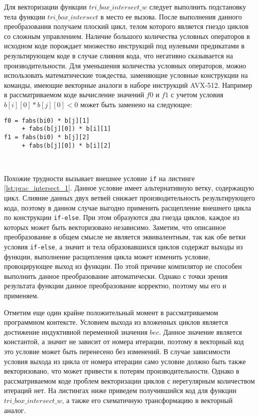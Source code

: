 \documentclass[
11pt,%
tightenlines,%
twoside,%
onecolumn,%
nofloats,%
nobibnotes,%
nofootinbib,%
superscriptaddress,%
noshowpacs,%
centertags]%
{revtex4}
\begin{document}
Для векторизации функции $tri\_box\_intersect\_w$ следует выполнить подстановку тела функции $tri\_box\_intersect$ в место ее вызова.
После выполнения данного преобразования получаем плоский цикл, телом которого является гнездо циклов со сложным управлением.
Наличие большого количества условных операторов в исходном коде порождает множество инструкций под нулевыми предикатами в результирующем коде в случае слияния кода, что негативно сказывается на производительности.
Для уменьшения количества условных операторов, можно использовать математические тождества, заменяющие условные конструкции на команды, имеющие векторные аналоги в наборе инструкций AVX-512.
Например в рассматриваемом коде вычисление значений $f0$ и $f1$ с учетом условия $b[i][0] * b[j][0] < 0$ может быть заменено на следующее:

\begin{lstlisting}[caption={Применение тождеств для использования векторных инструкций.},label={lst:prac_intersect_16_2}]
f0 = fabs(bi0) * b[j][1]
     + fabs(b[j][0]) * b[i][1]
f1 = fabs(bi0) * b[j][2]
     + fabs(b[j][0]) * b[i][2]
\end{lstlisting}

\

Похожие трудности вызывает внешнее условие \texttt{if} на листинге \ref{lst:prac_intersect_1}.
Данное условие имеет альтернативную ветку, содержащую цикл.
Слияние данных двух ветвей снижает производительность результирующего кода, поэтому в данном случае выгодно применить расщепление внешнего цикла по конструкции \texttt{if-else}.
При этом образуются два гнезда циклов, каждое из которых может быть векторизовано независимо.
Заметим, что описанное преобразование в общем смысле не является эквивалентным, так как обе ветки условия \texttt{if-else}, а значит и тела образовавшихся циклов содержат выходы из функции, выполнение расщепления цикла может изменить условие, провоцирующее выход из функции.
По этой причине компилятор не способен выполнить данное преобразование автоматически.
Однако с точки зрения результата функции данное преобразование корректно, поэтому мы его и применяем.

Отметим еще один крайне положительный момент в рассматриваемом программном контексте.
Условием выхода из вложенных циклов является достижение индуктивной переменной значения $bec$.
Данное значение является константой, а значит не зависит от номера итерации, поэтому в векторный код это условие может быть перенесено без изменений.
В случае зависимости условия выхода из цикла от номера итерации само условие должно быть также векторизовано, что может привести к потерям производительности.
Однако в рассматриваемом коде проблем векторизации циклов с нерегулярным количеством итераций нет.
На листингах ниже приведем получившийся код для функции $tri\_box\_intersect\_w$, а также его схематичную трансформацию в векторный аналог.
\end{document}
